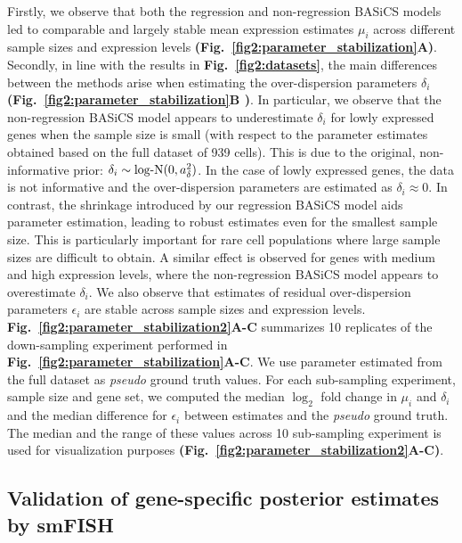 Firstly, we observe that both the regression and non-regression BASiCS models led to comparable and largely stable mean expression estimates $\mu_i$ across different sample sizes and expression levels \textbf{(Fig.~\ref{fig2:parameter_stabilization}A)}. Secondly, in line with the results in \textbf{Fig.~\ref{fig2:datasets}}, the main differences between the methods arise when estimating the over-dispersion parameters $\delta_i$ \textbf{(Fig.~\ref{fig2:parameter_stabilization}B )}. In particular, we observe that the non-regression BASiCS model appears to underestimate $\delta_i$ for lowly expressed genes when the sample size is small (with respect to the parameter estimates obtained based on the full dataset of 939 cells). This is due to the original, non-informative prior: $\delta_i\sim\textnormal{log-N}(0,a_\delta^2)$. In the case of lowly expressed genes, the data is not informative and the over-dispersion parameters are estimated as $\delta_i\approx{}0$. In contrast, the shrinkage introduced by our regression BASiCS model aids parameter estimation, leading to robust estimates even for the smallest sample size. This is particularly important for rare cell populations where large sample sizes are difficult to obtain. A similar effect is observed for genes with medium and high expression levels, where the non-regression BASiCS model appears to overestimate $\delta_i$. We also observe that estimates of residual over-dispersion parameters $\epsilon_i$ are stable across sample sizes and expression levels. \textbf{Fig.~\ref{fig2:parameter_stabilization2}A-C} summarizes 10 replicates of the down-sampling experiment performed in \textbf{Fig.~\ref{fig2:parameter_stabilization}A-C}. We use parameter estimated from the full dataset as \emph{pseudo} ground truth values. For each sub-sampling experiment, sample size and gene set, we computed the median $\log_2$ fold change in $\mu_i$ and $\delta_i$ and the median difference for $\epsilon_i$ between estimates and the \emph{pseudo} ground truth. The median and the range of these values across 10 sub-sampling experiment is used for visualization purposes \textbf{(Fig.~\ref{fig2:parameter_stabilization2}A-C)}. 

\subsection{Validation of gene-specific posterior estimates by smFISH}

